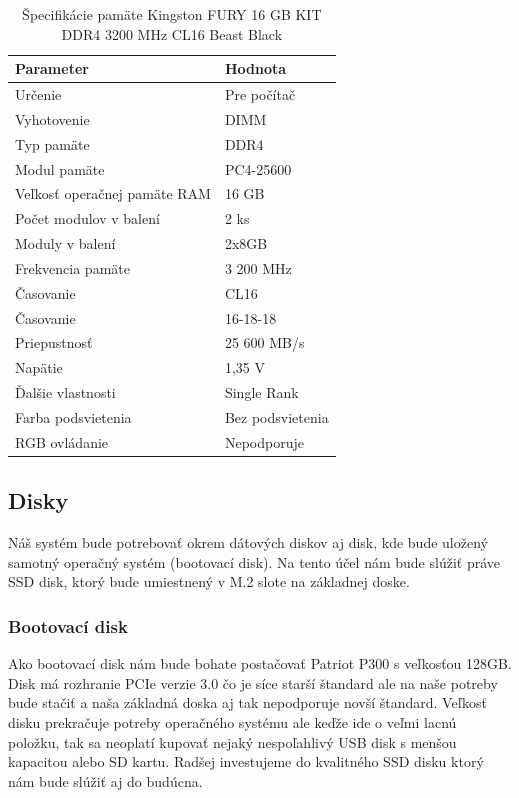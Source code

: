 \documentclass[12pt,oneside,slovak,a4paper]{article}
\begin{document}
\begin{table}[h]
\centering
\begin{tabularx}{\textwidth}{|l|X|}
\hline
\textbf{Parameter} & \textbf{Hodnota} \\ \hline
Určenie & Pre počítač \\ \hline
Vyhotovenie & DIMM \\ \hline
Typ pamäte & DDR4 \\ \hline
Modul pamäte & PC4-25600 \\ \hline
Veľkosť operačnej pamäte RAM & 16 GB \\ \hline
Počet modulov v balení & 2 ks \\ \hline
Moduly v balení & 2x8GB \\ \hline
Frekvencia pamäte & 3 200 MHz \\ \hline
Časovanie & CL16 \\ \hline
Časovanie & 16-18-18 \\ \hline
Priepustnosť & 25 600 MB/s \\ \hline
Napätie & 1,35 V \\ \hline
Ďalšie vlastnosti & Single Rank \\ \hline
Farba podsvietenia & Bez podsvietenia \\ \hline
RGB ovládanie & Nepodporuje \\ \hline
\end{tabularx}
\captionsetup{justification=centering,margin=2cm}
\caption{Špecifikácie pamäte Kingston FURY 16 GB KIT DDR4 3200 MHz CL16 Beast Black}
\end{table}

\subsection{Disky}
Náš systém bude potrebovať okrem dátových diskov aj disk, kde bude uložený samotný operačný systém (bootovací disk). Na tento účel nám bude slúžiť práve SSD disk, ktorý bude umiestnený v M.2 slote na základnej doske.

\subsubsection{Bootovací disk}
Ako bootovací disk nám bude bohate postačovať Patriot P300 s veľkosťou 128GB. Disk má rozhranie PCIe verzie 3.0 čo je síce starší štandard ale na naše potreby bude stačiť a naša základná doska aj tak nepodporuje novší štandard. Veľkosť disku prekračuje potreby operačného systému ale keďže ide o veľmi lacnú položku, tak sa neoplatí kupovať nejaký nespoľahlivý USB disk s menšou kapacitou alebo SD kartu. Radšej investujeme do kvalitného SSD disku ktorý nám bude slúžiť aj do budúcna.
\end{document}
